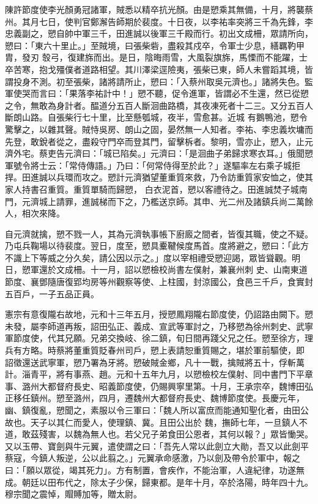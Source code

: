 \begin{pinyinscope}
 陳許節度使李光顏勇冠諸軍，賊悉以精卒抗光顏。由是愬乘其無備，十月，將襲蔡州。其月七日，使判官鄭澥告師期於裴度。十日夜，以李祐率突將三千為先鋒，李忠義副之，愬自帥中軍三千，田進誠以後軍三千殿而行。初出文成柵，眾請所向，愬曰：「東六十里止。」至賊境，曰張柴砦，盡殺其戍卒，令軍士少息，繕羈靮甲胄，發刃
 彀弓，復建旆而出。是日，陰晦雨雪，大風裂旗旆，馬慄而不能躍，士卒苦寒，抱戈殭僕者道路相望。其川澤梁逕險夷，張柴已東，師人未嘗蹈其境，皆謂投身不測。初至張柴，諸將請所止，愬曰：「入蔡州取吳元濟也。」諸將失色。監軍使哭而言曰：「果落李祐計中！」愬不聽，促令進軍，皆謂必不生還，然已從愬之令，無敢為身計者。醖道分五百人斷洄曲路橋，其夜凍死者十二三。又分五百人斷朗山路。自張柴行七十里，比至懸瓠城，夜半，雪愈甚。近城
 有鵝鴨池，愬令驚擊之，以雜其聲。賊恃吳房、朗山之固，晏然無一人知者。李祐、李忠義坎墉而先登，敢銳者從之，盡殺守門卒而登其門，留擊柝者。黎明，雪亦止，愬入，止元濟外宅。蔡吏告元濟曰：「城已陷矣。」元濟曰：「是洄曲子弟歸求寒衣耳。」俄聞愬軍號令將士云：「常侍傳語。」乃曰：「何常侍得至於此？」遂驅率左右乘子城拒捍。田進誠以兵環而攻之。愬計元濟猶望董重質來救，乃令訪重質家安恤之，使其家人持書召重質。重質單騎而歸愬，
 白衣泥首，愬以客禮待之。田進誠焚子城南門，元濟城上請罪，進誠梯而下之，乃檻送京師。其申、光二州及諸鎮兵尚二萬餘人，相次來降。



 自元濟就擒，愬不戮一人，其為元濟執事帳下廚廄之間者，皆復其職，使之不疑。乃屯兵鞠場以待裴度。翌日，度至，愬具櫜鞬候度馬首。度將避之，愬曰：「此方不識上下等威之分久矣，請公因以示之。」度以宰相禮受愬迎謁，眾皆聳觀。明日，愬軍還於文成柵。十一月，詔以愬檢校尚書左僕射，兼襄州刺
 史、山南東道節度、襄鄧隨唐復郢均房等州觀察等使、上柱國，封涼國公，食邑三千戶，食實封五百戶，一子五品正員。



 憲宗有意復隴右故地，元和十三年五月，授愬鳳翔隴右節度使，仍詔路由闕下。愬未發，屬李師道再叛，詔田弘正、義成、宣武等軍討之，乃移愬為徐州刺史、武寧軍節度使，代其兄願。兄弟交換岐、徐二鎮，旬日間再踐父兄之任。愬至徐方，理兵有方略。時蔡將董重質貶春州司戶，愬上表請恕重質賜之，堪於軍前驅使，即
 詔徵還送武寧軍，愬乃署為牙將。愬破賊金鄉，凡十一戰，擒賊將五十，俘斬萬計。淄青平，將有事燕、趙。元和十五年九月，以愬檢校左僕射、同中書門下平章事、潞州大都督府長史、昭義節度使，仍賜興寧里第。十月，王承宗卒，魏博田弘正移任鎮州。愬至潞州，四月，遷魏州大都督府長史、魏博節度使。長慶元年，幽、鎮復亂，愬聞之，素服以令三軍曰：「魏人所以富庶而能通知聖化者，由田公故也。天子以其仁而愛人，使理鎮、冀。且田公出於
 魏，撫師七年，一旦鎮人不道，敢茲殘害，以魏為無人也。若父兄子弟食田公恩者，其何以報？」眾皆慟哭。又以玉帶、寶劍與牛元翼，遣使謂之曰：「吾先人常以此劍立大勛，吾又以此劍平蔡寇，今鎮人叛逆，公以此翦之。」元翼承命感激，乃以劍及帶令於軍中，報之曰：「願以眾從，竭其死力」。方有制置，會疾作，不能治軍，人違紀律，功遂無成。朝廷以田布代之，除太子少保，歸東都。是年十月，卒於洛陽，時年四十九。穆宗聞之震悼，賵賻加等，贈太尉。




\end{pinyinscope}
